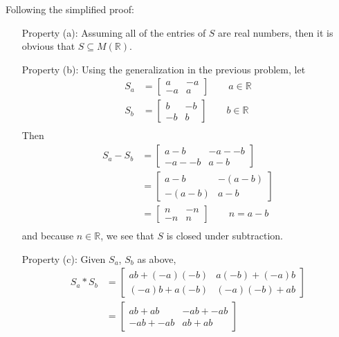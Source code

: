 \documentclass{article}
\begin{document}
\begin{enumerate}
			Following the simplified proof:
			\begin{enumerate}
				\item [Property (a):] Assuming all of the entries of $S$ are real numbers, then it 
					is obvious that $S \subseteq M(\mathbb{R})$.
				\item [Property (b):] Using the generalization in the previous problem, let
					\begin{align*}
						S_a & = 
							\begin{bmatrix} a & -a \\ -a & a \end{bmatrix} \qquad a \in \mathbb{R}\\
						S_b & = 
							\begin{bmatrix} b & -b \\ -b & b \end{bmatrix} \qquad b \in \mathbb{R}\\
					\end{align*}
					Then
					\begin{align*}
						S_a - S_b & = 
							\begin{bmatrix} a - b & -a - -b \\ -a - -b & a - b \end{bmatrix} \\
								  & = 
							\begin{bmatrix} a - b & -(a - b) \\ -(a - b) & a - b \end{bmatrix} \\
								  & = 
							\begin{bmatrix} n & -n \\ -n & n \end{bmatrix} \qquad n = a - b \\
					\end{align*}
					and because $n \in \mathbb{R}$, we see that $S$ is closed under subtraction.
				\item [Property (c):] Given $S_a$, $S_b$ as above,
					\begin{align*}
						S_a * S_b & = \begin{bmatrix} ab + (-a)(-b) & a(-b) + (-a)b \\
									  				  (-a)b + a(-b) & (-a)(-b) + ab \end{bmatrix} \\
								  & = \begin{bmatrix} ab + ab & -ab + -ab \\
									  				  -ab + -ab & ab + ab \end{bmatrix} \\

\end{align*}
\end{enumerate}
\end{enumerate}
\end{document}
